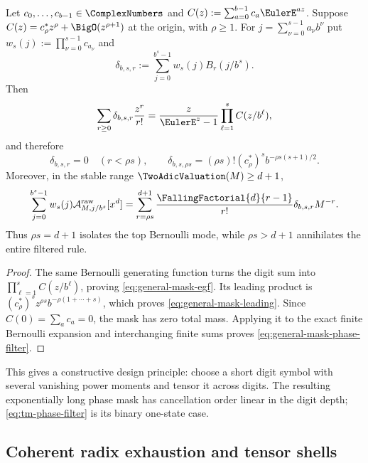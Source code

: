 \begin{theorem}
\label{thm:general-digit-mask}
Let $c_0,\ldots,c_{b-1}\in\ComplexNumbers$ and
$C(z):=\sum_{a=0}^{b-1}c_a\EulerE^{az}$.  Suppose
$C(z)=c_\rho^*z^\rho+\BigO(z^{\rho+1})$ at the origin, with $\rho\ge1$.
For $j=\sum_{\nu=0}^{s-1}a_\nu b^\nu$ put
$w_s(j):=\prod_{\nu=0}^{s-1}c_{a_\nu}$ and
\[
 \delta_{b,s,r}:=\sum_{j=0}^{b^s-1}w_s(j)B_r(j/b^s).
\]
Then
\begin{equation}
 \sum_{r\ge0}\delta_{b,s,r}{z^r\over r!}
 ={z\over\EulerE^z-1}\prod_{\ell=1}^s C(z/b^\ell),
 \label{eq:general-mask-egf}
\end{equation}
and therefore
\begin{equation}
 \delta_{b,s,r}=0\quad(r<\rho s),
 \qquad
 \delta_{b,s,\rho s}
 =(\rho s)!(c_\rho^*)^s b^{-\rho s(s+1)/2}.
 \label{eq:general-mask-leading}
\end{equation}
Moreover, in the stable range $\TwoAdicValuation(M)\ge d+1$,
\begin{equation}
 \sum_{j=0}^{b^s-1}w_s(j)
 \mathcal A^{\mathrm{raw}}_{M,j/b^s}[x^d]
 =\sum_{r=\rho s}^{d+1}{\FallingFactorial{d}{r-1}\over r!}
 \delta_{b,s,r}M^{-r}.
 \label{eq:general-mask-phase-filter}
\end{equation}
Thus $\rho s=d+1$ isolates the top Bernoulli mode, while
$\rho s>d+1$ annihilates the entire filtered rule.
\end{theorem}

\begin{proof}
The same Bernoulli generating function turns the digit sum into
$\prod_{\ell=1}^sC(z/b^\ell)$, proving
\eqref{eq:general-mask-egf}.  Its leading product is
$(c_\rho^*)^sz^{\rho s}b^{-\rho(1+\cdots+s)}$, which proves
\eqref{eq:general-mask-leading}.  Since $C(0)=\sum_ac_a=0$, the mask
has zero total mass.  Applying it to the exact finite Bernoulli expansion
and interchanging finite sums proves \eqref{eq:general-mask-phase-filter}.
\end{proof}

This gives a constructive design principle: choose a short digit symbol
with several vanishing power moments and tensor it across digits.  The
resulting exponentially long phase mask has cancellation order linear in
the digit depth; \eqref{eq:tm-phase-filter} is its binary one-state case.

\subsection{Coherent radix exhaustion and tensor shells}

